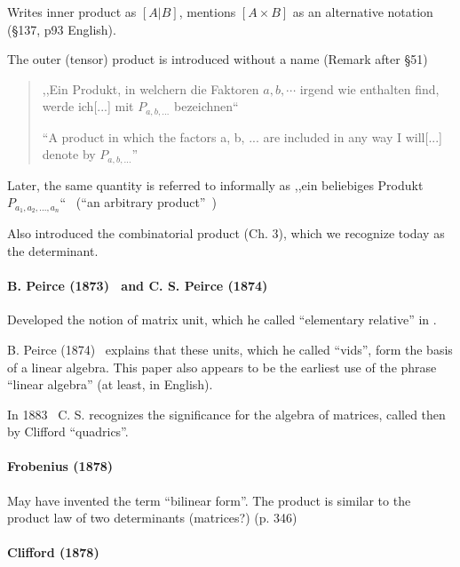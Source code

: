Writes inner product as $[A | B]$, mentions $[A \times B]$ as an alternative notation (\S 137, p93 English).

The outer (tensor) product is introduced without a name (Remark after \S 51)

\begin{quote}
,,Ein Produkt, in welchern die Faktoren $a, b, \cdots$ irgend wie enthalten find, werde ich[...] mit $P_{a,b,...}$ bezeichnen`` \cite[p. 24, \S 43]{Grassmann1862}

``A product in which the factors a, b, ... are included in any way I will[...] denote by $P_{a,b,...}$''~\cite[p. 22, \S 43]{Grassmann2000}
\end{quote}

Later, the same quantity is referred to informally as
,,ein beliebiges Produkt $P_{a_1, a_2, ..., a_n}$``~\cite[\S 353]{Grassmann1862} (``an arbitrary product''~\cite[p. 196, \S 353]{Grassmann2000})

Also introduced the combinatorial product (Ch. 3), which we recognize today as the determinant.


\paragraph{B. Peirce (1873)~\cite{Peirce1873} and C. S. Peirce (1874)~\cite{Peirce1874}}

Developed the notion of matrix unit, which he called ``elementary relative'' in \cite[p.359]{Peirce1873}.

B. Peirce (1874)~\cite{Peirce1874} explains that these units, which he called ``vids'', form the basis of a linear algebra. This paper also appears to be the earliest use of the phrase ``linear algebra'' (at least, in English).

In 1883~\cite{Peirce1883} C. S. recognizes the significance for the algebra of matrices, called then by Clifford ``quadrics''.

\paragraph{Frobenius (1878)~\cite{Frobenius1878}}

May have invented the term ``bilinear form''.
The product is similar to the product law of two determinants (matrices?) (p. 346)


\paragraph{Clifford (1878)~\cite{Clifford1878}}

